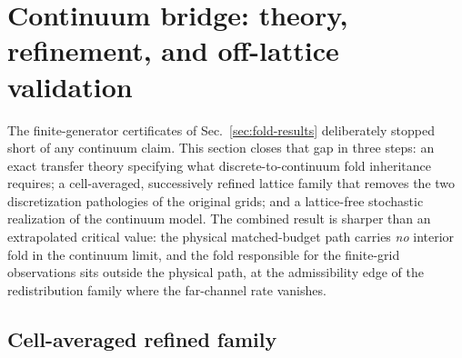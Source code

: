 
\section{Continuum bridge: theory, refinement, and off-lattice validation}
\label{sec:bridge}

The finite-generator certificates of Sec.~\ref{sec:fold-results} deliberately
stopped short of any continuum claim. This section closes that gap in three
steps: an exact transfer theory specifying what discrete-to-continuum fold
inheritance requires; a cell-averaged, successively refined lattice family
that removes the two discretization pathologies of the original grids; and a
lattice-free stochastic realization of the continuum model. The combined
result is sharper than an extrapolated critical value: the physical
matched-budget path carries \emph{no} interior fold in the continuum limit,
and the fold responsible for the finite-grid observations sits outside the
physical path, at the admissibility edge of the redistribution family where
the far-channel rate vanishes.


\subsection{Cell-averaged refined family}
\label{sec:refined-family}

